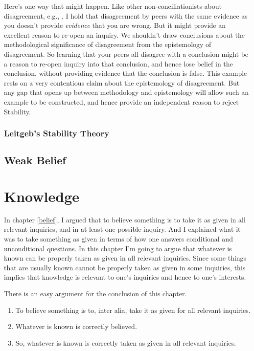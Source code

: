 \documentclass[11pt,]{book}
\providecommand{\tightlist}{%
  \setlength{\itemsep}{0pt}\setlength{\parskip}{0pt}}
\begin{document}
Here's one way that might happen. Like other non-conciliationists about disagreement, e.g., \citet{Kelly2010-KELPDA}, I hold that disagreement by peers with the same evidence as you doesn't provide \emph{evidence} that you are wrong. But it might provide an excellent reason to re-open an inquiry. We shouldn't draw conclusions about the methodological significance of disagreement from the epistemology of disagreement. So learning that your peers all disagree with a conclusion might be a reason to re-open inquiry into that conclusion, and hence lose belief in the conclusion, without providing evidence that the conclusion is false. This example rests on a very contentious claim about the epistemology of disagreement. But any gap that opens up between methodology and epistemology will allow such an example to be constructed, and hence provide an independent reason to reject Stability.

\hypertarget{leitgeb}{%
\subsection{Leitgeb's Stability Theory}\label{leitgeb}}

\hypertarget{weak-belief}{%
\section{Weak Belief}\label{weak-belief}}

\hypertarget{knowledge}{%
\chapter{Knowledge}\label{knowledge}}

In chapter \ref{belief}, I argued that to believe something is to take it as given in all relevant inquiries, and in at least one possible inquiry. And I explained what it was to take something as given in terms of how one answers conditional and unconditional questions. In this chapter I'm going to argue that whatever is known can be properly taken as given in all relevant inquiries. Since some things that are usually known cannot be properly taken as given in some inquiries, this implies that knowledge is relevant to one's inquiries and hence to one's interests.

There is an easy argument for the conclusion of this chapter.

\begin{enumerate}
\def\labelenumi{\arabic{enumi}.}
\tightlist
\item
  To believe something is to, inter alia, take it as given for all relevant inquiries.
\item
  Whatever is known is correctly believed.
\item
  So, whatever is known is correctly taken as given in all relevant inquiries.
\end{enumerate}
\end{document}
